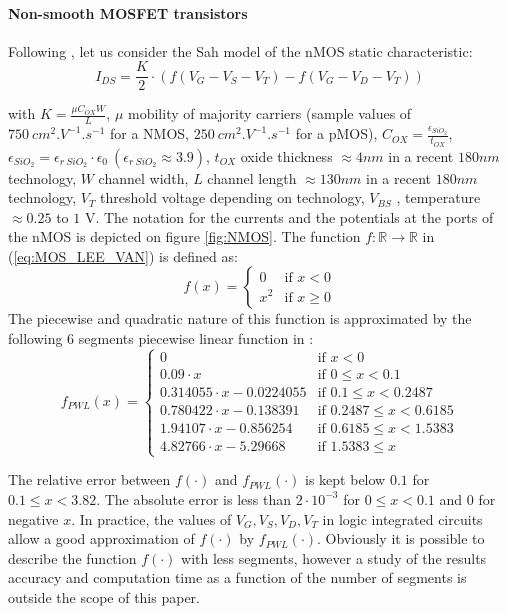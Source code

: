 \documentclass{article}
\def\geq{\geqslant}
\def\leq{\leqslant}
\begin{document}
\paragraph{Non-smooth MOSFET transistors}  Following \cite{leenaerts-bokhoven1998}, let us consider the Sah model of the nMOS static characteristic:
\begin{equation}
  \label{eq:MOS_LEE_VAN}
I_{DS} = \frac{K}{2} \cdot (f(V_G-V_S-V_T) - f(V_G-V_D-V_T))
\end{equation}


with $K = \frac{\mu C_{OX} W}{L}$, $\mu$ mobility of majority carriers (sample values of $750~cm^2.V^{-1}.s^{-1}$ for a NMOS, $250~cm^2.V^{-1}.s^{-1}$ for a pMOS), $C_{OX} = \frac{\epsilon_{SiO_2}}{t_{OX}}$, $\epsilon_{SiO_2} = \epsilon_{r~SiO_2} \cdot \epsilon_0 \ (\epsilon_{r~SiO_2} \approx 3.9)$, $t_{OX}$ oxide thickness $\approx 4 nm$ in a recent $180 nm$ technology, $W$ channel width, $L$ channel length $\approx 130 nm$ in a recent $180 nm$ technology, $V_T$ threshold voltage depending on technology, $V_{BS}$ , temperature $\approx 0.25$ to $1$ V. The notation for the currents and the potentials at the ports of the nMOS is depicted on figure \ref{fig:NMOS}. The function $f :\mathbb{R} \longrightarrow \mathbb{R}$ in (\ref{eq:MOS_LEE_VAN}) is defined as:
\[
f(x) = \left\{ \begin{array}{ll}
0 & \textrm{if $x < 0$}\\
x^2 & \textrm{if $x \geq 0$}
\end{array} \right.
\]
The piecewise and quadratic nature of this function is approximated by the following 6 segments piecewise linear
function in \cite{leenaerts-bokhoven1998}: 
\begin{equation}\label{6segments}
f_{PWL}(x) = \left\{ \begin{array}{ll}
0                            & \textrm{if $x < 0$}\\
0.09 \cdot x                 & \textrm{if $0 \leq x < 0.1$}\\
0.314055 \cdot x - 0.0224055 & \textrm{if $0.1 \leq x < 0.2487$}\\
0.780422 \cdot x - 0.138391  & \textrm{if $0.2487 \leq x < 0.6185$}\\
1.94107 \cdot x  - 0.856254  & \textrm{if $0.6185 \leq x < 1.5383$}\\
4.82766 \cdot x - 5.29668    & \textrm{if $1.5383 \leq x $}
\end{array} \right.
\end{equation}

The relative error between $f(\cdot)$ and $f_{PWL}(\cdot)$ is kept below $0.1$ for $0.1 \leq x < 3.82$. The absolute error is less than $2 \cdot 10^{-3}$ for $0 \leq x < 0.1$ and $0$ for negative $x$. In practice, the values of $V_G,V_S,V_D,V_T$ in logic integrated circuits allow  a good approximation of $f(\cdot)$ by $f_{PWL}(\cdot)$. Obviously it is possible to describe the function $f(\cdot)$ with less segments, however a study of the results accuracy and computation time as a function of the number of segments is outside the scope of this paper. 
\end{document}
